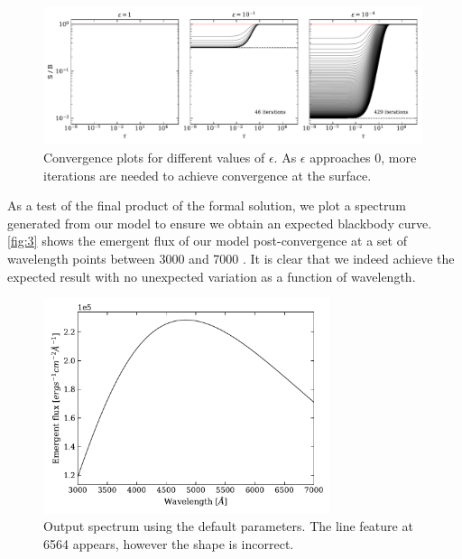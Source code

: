 \documentclass[12pt]{article}
\begin{document}
\begin{figure}[ht]
 \centering
 \includegraphics[width=0.99\textwidth]{eps_convergence.pdf}
 \caption{Convergence plots for different values of $\epsilon$. As $\epsilon$ approaches 0, more iterations are needed to achieve convergence at the surface.}
   \label{fig:2}
\end{figure}

As a test of the final product of the formal solution, we plot a spectrum generated from our model to ensure we obtain an expected blackbody curve. \autoref{fig:3} shows the emergent flux of our model post-convergence at a set of wavelength points between 3000 and 7000 \text{\AA}. It is clear that we indeed achieve the expected result with no unexpected variation as a function of wavelength.

\begin{figure}[ht]
 \centering
 \includegraphics[width=0.75\textwidth]{spectrum.pdf}
 \caption{Output spectrum using the default parameters. The line feature at 6564 \text{\AA } appears, however the shape is incorrect.}
  \label{fig:3}
\end{figure}
\end{document}
